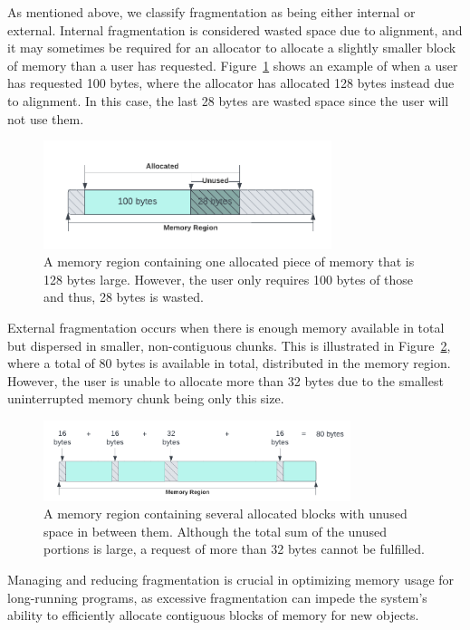 As mentioned above, we classify fragmentation as being either internal or external. Internal fragmentation is considered wasted space due to alignment, and it may sometimes be required for an allocator to allocate a slightly smaller block of memory than a user has requested. Figure~\ref{fig:internal_fragmentation} shows an example of when a user has requested 100 bytes, where the allocator has allocated 128 bytes instead due to alignment. In this case, the last 28 bytes are wasted space since the user will not use them.

\begin{figure}[H]
    \centering
    \includegraphics[width=0.75\textwidth]{figures/internal_fragmentation.png}
    \caption{A memory region containing one allocated piece of memory that is 128 bytes large. However, the user only requires 100 bytes of those and thus, 28 bytes is wasted.}
    \label{fig:internal_fragmentation}
\end{figure}

External fragmentation occurs when there is enough memory available in total but dispersed in smaller, non-contiguous chunks. This is illustrated in Figure~\ref{fig:external_fragmentation}, where a total of 80 bytes is available in total, distributed in the memory region. However, the user is unable to allocate more than 32 bytes due to the smallest uninterrupted memory chunk being only this size.

\begin{figure}[H]
    \centering
    \includegraphics[width=0.8\textwidth]{figures/external_fragmentation.png}
    \caption{A memory region containing several allocated blocks with unused space in between them. Although the total sum of the unused portions is large, a request of more than 32 bytes cannot be fulfilled.}
    \label{fig:external_fragmentation}
\end{figure}

Managing and reducing fragmentation is crucial in optimizing memory usage for long-running programs, as excessive fragmentation can impede the system's ability to efficiently allocate contiguous blocks of memory for new objects.

